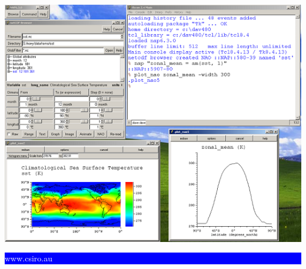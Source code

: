 {
\addtolength{\hoffset}{-39mm}
\thispagestyle{empty}

\toptitle

\enlargethispage{1000mm}

\vspace*{15mm}

\hspace*{7mm}
\includegraphics{screen.png}

\vspace*{15mm}

\colorbox{blue}{
    \textcolor{white}{
	\rule[-10mm]{0mm}{27mm}
	\hspace{159mm}
	\textsf{
	    {\Large www.csiro.au}
	}
	\hspace{10mm}
    }
}

\pagebreak
\mbox{}
\pagebreak
\thispagestyle{empty}
\toptitle
\pagebreak

\vspace*{140mm}
}

